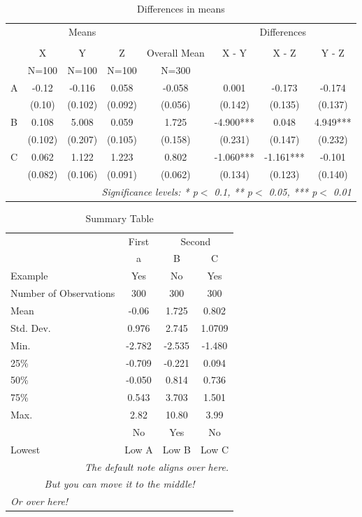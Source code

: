 \begin{table}[!htbp]
  \centering
  \caption{Differences in means}
  \label{table:differencesinmeans}
\begin{tabular}{lccccccc}
  \toprule
  \toprule
   & \multicolumn{3}{c}{Means} & \multicolumn{1}{c}{} & \multicolumn{3}{c}{Differences} \\
  \cline{2-4}\cline{6-8}\\

   & X & Y & Z & Overall Mean & X - Y & X - Z & Y - Z\\
   & N=100 & N=100 & N=100 & N=300 &  &  & \\
  \midrule
  A & -0.12 & -0.116 & 0.058 & -0.058 & 0.001 & -0.173 & -0.174 \\
   & (0.10) & (0.102) & (0.092) & (0.056) & (0.142) & (0.135) & (0.137) \\
  B & 0.108 & 5.008 & 0.059 & 1.725 & -4.900*** & 0.048 & 4.949*** \\
   & (0.102) & (0.207) & (0.105) & (0.158) & (0.231) & (0.147) & (0.232) \\
  C & 0.062 & 1.122 & 1.223 & 0.802 & -1.060*** & -1.161*** & -0.101 \\
   & (0.082) & (0.106) & (0.091) & (0.062) & (0.134) & (0.123) & (0.140) \\
  \bottomrule
  \multicolumn{8}{r}{{\small \textit{Significance levels: * p$<$ 0.1, ** p$<$ 0.05, *** p$<$ 0.01}}}\\
\end{tabular}
\end{table}
\begin{table}[!htbp]
  \centering
\begin{tabular}{lccc}
  \toprule
  \toprule
   & \multicolumn{1}{c}{First} & \multicolumn{2}{c}{Second} \\
   & a & B & C\\
  Example & Yes & No & Yes\\
  \midrule
  Number of Observations & 300 & 300 & 300 \\
  Mean & -0.06 & 1.725 & 0.802 \\
  Std. Dev. & 0.976 & 2.745 & 1.0709 \\
  Min. & -2.782 & -2.535 & -1.480 \\
  25\% & -0.709 & -0.221 & 0.094 \\
  50\% & -0.050 & 0.814 & 0.736 \\
  75\% & 0.543 & 3.703 & 1.501 \\
  Max. & 2.82 & 10.80 & 3.99 \\
   & No & Yes & No\\
  \bottomrule
  Lowest & Low A & Low B & Low C\\
  \bottomrule
  \multicolumn{4}{r}{{\small \textit{The default note aligns over here.}}}\\
  \multicolumn{4}{c}{{\small \textit{But you can move it to the middle!}}}\\
  \multicolumn{4}{l}{{\small \textit{Or over here!}}}\\
\end{tabular}
  \caption{Summary Table}
  \label{table:summarytable}
\end{table}
